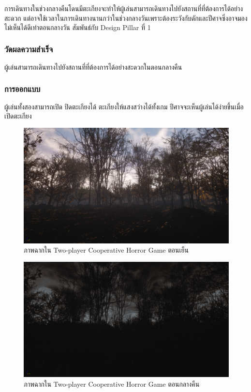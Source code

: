 การเดินทางในช่วงกลางคืนโดนมีตะเกียงจะทำให้ผู้เล่นสามารถเดินทางไปยังสถานที่ที่ต้องการได้อย่างสะดวก แต่อาจใช้เวลาในการเดินทางนานกว่าในช่วงกลางวันเพราะต้องระวังกับดักและปีศาจซึ่งอาจมองไม่เห็นได้ดีเท่าตอนกลางวัน สัมพันธ์กับ Design Pillar ที่ 1

\subsubsection{วัดผลความสำเร็จ}

ผู้เล่นสามารถเดินทางไปยังสถานที่ที่ต้องการได้อย่างสะดวกในตอนกลางคืน

\subsubsection{การออกแบบ}

ผู้เล่นทั้งสองสามารถเปิด ปิดตะเกียงได้ ตะเกียงให้แสงสว่างได้ทั้งเกม ปีศาจจะเห็นผู้เล่นได้ง่ายขึ้นเมื่อเปิดตะเกียง

\begin{figure}[h]
  \begin{center}
  \includegraphics[width=\textwidth]{./img/screenshots/dayshot1.png}
  \end{center}
  \caption[ภาพฉากใน Two-player Cooperative Horror Game ตอนเย็น]{ภาพฉากใน Two-player Cooperative Horror Game ตอนเย็น}
  \label{fig:dayshot1}
\end{figure}

\begin{figure}[h]
  \begin{center}
  \includegraphics[width=\textwidth]{./img/screenshots/nightshot1.png}
  \end{center}
  \caption[ภาพฉากใน Two-player Cooperative Horror Game ตอนเย็น]{ภาพฉากใน Two-player Cooperative Horror Game ตอนกลางคืน}
  \label{fig:nightshot1}
\end{figure}

